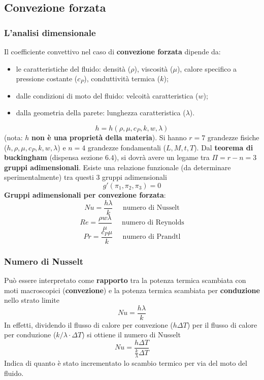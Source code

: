 \subsection{Convezione forzata}
\subsubsection{L'analisi dimensionale}
Il coefficiente convettivo nel caso di \textbf{convezione forzata} dipende da:
\begin{itemize}
    \item le caratteristiche del fluido: densità ($\rho$), viscosità ($\mu$), calore specifico a pressione costante ($c_P$), conduttività termica ($k$);
    \item dalle condizioni di moto del fluido: velcoità caratteristica ($w$);
    \item dalla geometria della parete: lunghezza caratteristica ($\lambda$).
\end{itemize}
\[
    h = h(\rho, \mu, c_P, k , w , \lambda)
\]
(nota: $h$ \textbf{non è una proprietà della materia}).\newline
\newline
Si hanno $r= 7$ grandezze fisiche ($h, \rho, \mu, c_P, k , w , \lambda$) e $n = 4$ grandezze fondamentali ($L,M,t,T$). \newline
\newline
Dal \textbf{teorema di buckingham} (dispensa sezione $6.4$), si dovrà avere un legame tra $\Pi = r - n = 3$ \textbf{gruppi adimensionali}.\newline
\newline
Esiste una relazione funzionale (da determinare sperimentalmente) tra questi $3$ gruppi adimensionali
\[
    g'(\pi_1, \pi_2, \pi_3) = 0
\]
\textbf{Gruppi adimensionali per convezione forzata}:
\[
    Nu = \frac{h\lambda}{k} \;\;\;\;\; \text{numero di Nusselt}
\]
\[
    Re = \frac{\rho w \lambda}{\mu} \;\;\;\;\;\text{numero di Reynolds}
\]
\[
    Pr = \frac{c_P \mu}{k} \;\;\;\;\;\text{numero di Prandtl}
\]
\subsubsection{Numero di Nusselt}
Può essere interpretato come \textbf{rapporto} tra la potenza termica
scambiata con moti macroscopici (\textbf{convezione}) e la potenza
termica scambiata per \textbf{conduzione} nello strato limite
\[
    Nu = \frac{h\lambda}{k}
\]
In effetti, dividendo il flusso di calore per convezione ($h \Delta T$)
per il flusso di calore per conduzione ($k / \lambda \cdot \Delta T$) si ottiene
il numero di Nusselt
\[
    Nu = \frac{h\Delta T}{\frac{k}{\lambda}\Delta T}
\]
Indica di quanto è stato incrementato lo scambio termico
per via del moto del fluido.
